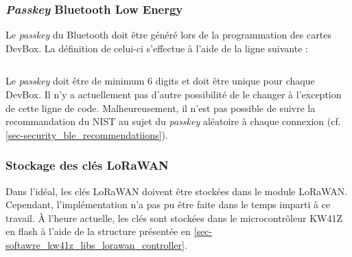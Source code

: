 \subsubsection{\textit{Passkey} Bluetooth Low Energy}

Le \textit{passkey} du Bluetooth doit être généré lors de la programmation des cartes DevBox. La définition de celui-ci s'effectue à l'aide de la ligne suivante : 
\begin{tcolorbox}
  [top=-1mm, bottom=-3mm, left=0mm, right=0mm, enhanced,breakable,
  attach boxed title to top center={yshift=-3mm,yshifttext=-1mm},colback=LightGray,colframe=DarkGray,
  colbacktitle=DarkGray, fonttitle=\footnotesize\bfseries,boxed title style={size=small,colframe=DarkGray},
  title=\path{app_preinclude.h} ]
\inputminted[firstline=35,lastline=36,bgcolor=LightGray,fontsize=\scriptsize,breaklines,linenos]{C}{SourceCode/app_preinclude.h}
\end{tcolorbox}

Le \textit{passkey} doit être de minimum 6 digits et doit être unique pour chaque DevBox. Il n'y a actuellement pas d'autre possibilité de le changer à l'exception de cette ligne de code. Malheureusement, il n'est pas possible de suivre la recommandation du NIST au sujet du \textit{passkey} aléatoire à chaque connexion (cf. \cref{sec-security_ble_recommendatiions}).

\subsubsection{Stockage des clés LoRaWAN}

Dans l'idéal, les clés LoRaWAN doivent être stockées dans le module LoRaWAN. Cependant, l'implémentation n'a pas pu être faite dans le temps imparti à ce travail. À l'heure actuelle, les clés sont stockées dans le microcontrôleur KW41Z en flash à l'aide de la structure  présentée en \cref{sec-softawre_kw41z_libs_lorawan_controller}.

